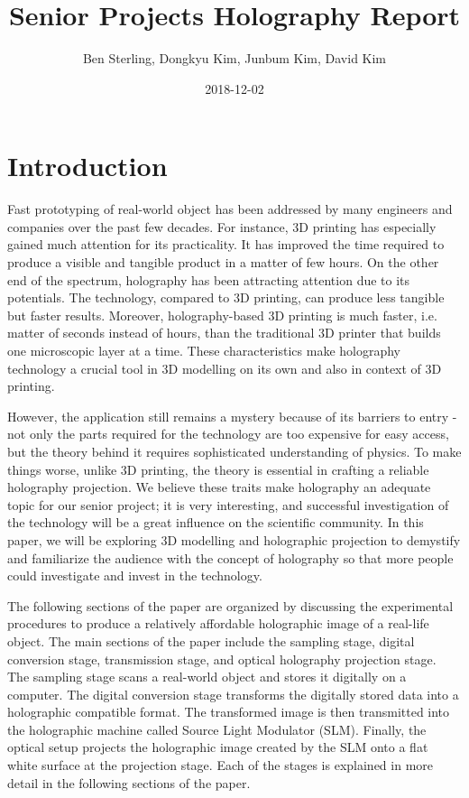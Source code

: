 \documentclass[12pt]{article}
\title{Senior Projects Holography Report}
\date{2018-12-02}
\author{Ben Sterling, Dongkyu Kim, Junbum Kim, David Kim}
\begin{document}
\maketitle
\clearpage

\section{Introduction}
\qquad
Fast prototyping of real-world object has been addressed by many engineers and companies over the past few decades. For instance, 3D printing has especially gained much attention for its practicality. It has improved the time required to produce a visible and tangible product in a matter of few hours. On the other end of the spectrum, holography has been attracting attention due to its potentials. The technology, compared to 3D printing, can produce less tangible but faster results. Moreover, holography-based 3D printing is much faster, i.e. matter of seconds instead of hours, than the traditional 3D printer that builds one microscopic layer at a time.\cite{Shusteffeaao5496} These characteristics make holography technology a crucial tool in 3D modelling on its own and also in context of 3D printing.

However, the application still remains a mystery because of its barriers to entry - not only the parts required for the technology are too expensive for easy access, but the theory behind it requires sophisticated understanding of physics. To make things worse, unlike 3D printing, the theory is essential in crafting a reliable holography projection. We believe these traits make holography an adequate topic for our senior project; it is very interesting, and successful investigation of the technology will be a great influence on the scientific community. In this paper, we will be exploring 3D modelling and holographic projection to demystify and familiarize the audience with the concept of holography so that more people could investigate and invest in the technology.
\par
The following sections of the paper are organized by discussing the experimental procedures to produce a relatively affordable holographic image of a real-life object. The main sections of the paper include the sampling stage, digital conversion stage, transmission stage, and optical holography projection stage. The sampling stage scans a real-world object and stores it digitally on a computer. The digital conversion stage transforms the digitally stored data into a holographic compatible format. The transformed image is then transmitted into the holographic machine called Source Light Modulator (SLM). Finally, the optical setup projects the holographic image created by the SLM onto a flat white surface at the projection stage. Each of the stages is explained in more detail in the following sections of the paper.
\end{document}
